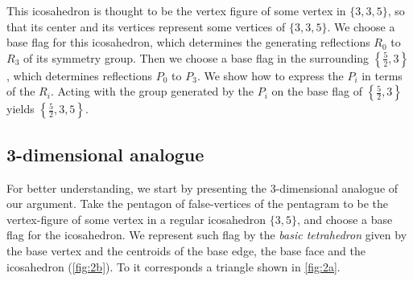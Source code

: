 \documentclass{article}
\theoremstyle{definition}
\begin{document}
	This icosahedron is thought to be the vertex figure of some vertex in $\{3,3,5\}$, so that its center and its vertices represent some vertices of $\{3,3,5\}$. We choose a base flag for this icosahedron, which determines the generating reflections $R_0$ to $R_3$ of its symmetry group. Then we choose a base flag in the surrounding $\left\{\frac{5}{2},3\right\}$, which determines reflections $P_0$ to $P_3$. We show how to express the $P_i$ in terms of the $R_i$. Acting with the group generated by the $P_i$ on the base flag of  $\left\{\frac{5}{2},3\right\}$ yields $\left\{\frac{5}{2},3,5\right\}$.
	
	\subsection{3-dimensional analogue}
	
	For better understanding, we start by presenting the 3-dimensional analogue of our argument. Take the pentagon of false-vertices of the pentagram to be the vertex-figure of some vertex in a regular icosahedron $\{3,5\}$, and choose a base flag for the icosahedron. We represent such flag by the \textit{basic tetrahedron} given by the base vertex and the centroids of the base edge, the base face and the icosahedron (\cref{fig:2b}). To it corresponds a triangle shown in \cref{fig:2a}.
	
\end{document}
